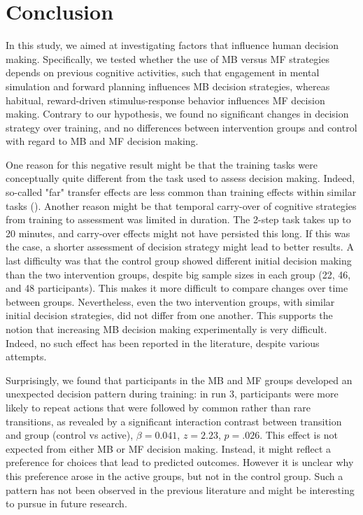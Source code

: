 \documentclass[11pt]{article} %
\begin{document}
\section{Conclusion}
In this study, we aimed at investigating factors that influence human decision making. Specifically, we tested whether the use of MB versus MF strategies depends on previous cognitive activities, such that engagement in mental simulation and forward planning influences MB decision strategies, whereas habitual, reward-driven stimulus-response behavior influences MF decision making. Contrary to our hypothesis, we found no significant changes in decision strategy over training, and no differences between intervention groups and control with regard to MB and MF decision making.

One reason for this negative result might be that the training tasks were conceptually quite different from the task used to assess decision making. Indeed, so-called "far" transfer effects are less common than training effects within similar tasks (\cite{jaeggi_short-_2011}). Another reason might be that temporal carry-over of cognitive strategies from training to assessment was limited in duration. The 2-step task takes up to 20 minutes, and carry-over effects might not have persisted this long. If this was the case, a shorter assessment of decision strategy might lead to better results. A last difficulty was that the control group showed different initial decision making than the two intervention groups, despite big sample sizes in each group (22, 46, and 48 participants). This makes it more difficult to compare changes over time between groups. Nevertheless, even the two intervention groups, with similar initial decision strategies, did not differ from one another. This supports the notion that increasing MB decision making experimentally is very difficult. Indeed, no such effect has been reported in the literature, despite various attempts.

Surprisingly, we found that participants in the MB and MF groups developed an unexpected decision pattern during training: in run 3, participants were more likely to repeat actions that were followed by common rather than rare transitions, as revealed by a significant interaction contrast between transition and group (control vs active), $\beta = 0.041$, $z = 2.23$, $p = .026$. This effect is not expected from either MB or MF decision making. Instead, it might reflect a preference for choices that lead to predicted outcomes. However it is unclear why this preference arose in the active groups, but not in the control group. Such a pattern has not been observed in the previous literature and might be interesting to pursue in future research.
\end{document}
